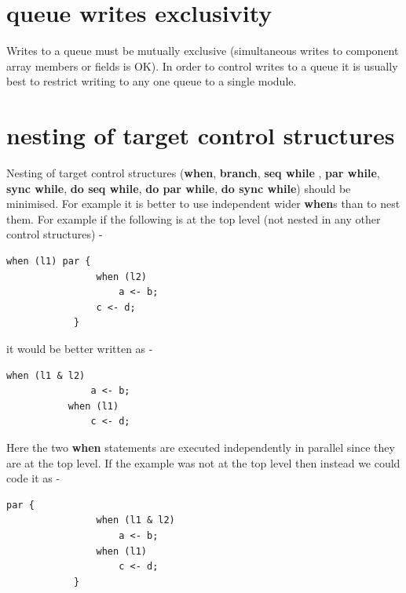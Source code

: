     \section{queue writes exclusivity}

        Writes to a queue must be mutually exclusive (simultaneous writes to
        component array members or fields is OK). In order to control writes
        to a queue it is usually best to restrict writing to any one queue to a
        single module.
    
    \section{nesting of target control structures}
    
        Nesting of target control structures ({\bf when}, {\bf branch}, {\bf seq
        while }, {\bf par while}, {\bf sync while}, {\bf do seq while}, {\bf do
        par while}, {\bf do sync while}) should be minimised. For example it is
        better to use independent wider {\bf when}s than to nest them. For
        example if the following is at the top level (not nested in any other
        control structures) -
        \begin{lstlisting}[gobble=8, language=threepl]
            when (l1) par {
                when (l2)
                    a <- b;
                c <- d;
            }
        \end{lstlisting}
        it would be better written as -
        \begin{lstlisting}[gobble=8, language=threepl]
           when (l1 & l2)
               a <- b;
           when (l1)
               c <- d;
        \end{lstlisting}
        Here the two {\bf when} statements are executed independently in
        parallel since they are at the top level. If the example was not
        at the top level then instead we could code it as -
        \begin{lstlisting}[gobble=8, language=threepl]
            par {
                when (l1 & l2)
                    a <- b;
                when (l1)
                    c <- d;
            }
        \end{lstlisting}

